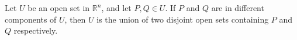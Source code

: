 Let $U$ be an open set in $\mathbb{R}^n$, and let $P, Q \in U$. If $P$ and $Q$ are in different components of $U$, then $U$ is the union of two disjoint open sets containing $P$ and $Q$ respectively.
